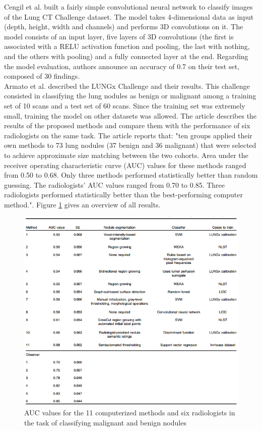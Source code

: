 Cengil et al. \cite{02} built a fairly simple convolutional neural network to classify images of the Lung CT Challenge dataset. The model takes 4-dimensional data as input (depth, height, width and channels) and performs 3D convolutions on it. The model consists of an input layer, five layers of 3D convolutions (the first is associated with a RELU activation function and pooling, the last with nothing, and the others with pooling) and a fully connected layer at the end. Regarding the model evaluation, authors announce an accuracy of 0.7 on their test set, composed of 30 findings.\\
Armato et al. \cite{12} described the LUNGx Challenge and their results. This challenge consisted in classifying the lung nodules as benign or malignant among a training set of 10 scans and a test set of 60 scans. Since the training set was extremely small, training the model on other datasets was allowed.  The article describes the results of the proposed methods and compare them with the performance of six radiologists on the same task. The article reports that: "ten groups applied their own methods to 73 lung nodules (37 benign and 36 malignant) that were selected to achieve approximate size matching between the two cohorts. Area under the receiver operating characteristic curve (AUC) values for these methods ranged from 0.50 to 0.68. Only three methods performed statistically better than random guessing. The radiologists’ AUC values ranged from 0.70 to 0.85. Three radiologists performed statistically better than the best-performing computer method."\cite{12}. Figure \ref{fig:LUNGx_challenge_all_results} gives an overview of all results.

\begin{figure}[!h]
\centering
\includegraphics[width=1\textwidth, keepaspectratio=true]{./figures/LUNGx_challenge_all_results.png}
\caption{AUC values for the 11 computerized methods and six radiologists in the task of classifying malignant and benign nodules}
\label{fig:LUNGx_challenge_all_results}
\end{figure}



